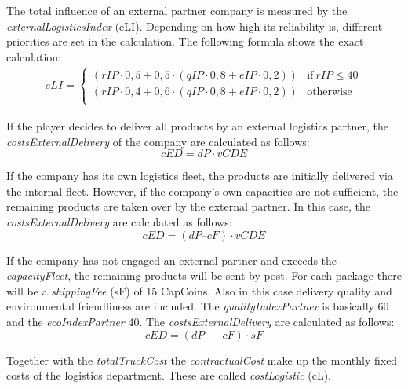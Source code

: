 The total influence of an external partner company is measured by the \textit{externalLogisticsIndex} (\gls{eLI}). Depending on how high its reliability is, different priorities are set in the calculation. The following formula shows the exact calculation: 
\begin{equation}
\label{func:externalLogisticIndex}
\begin{aligned}
eLI = 
    \begin{cases}
     (rIP\cdot0,5 + 0,5\cdot(qIP\cdot0,8 + eIP\cdot0,2)) & \text{if} ~rIP \leq 40\\
     (rIP\cdot0,4 + 0,6\cdot(qIP\cdot0,8 + eIP\cdot0,2)) & \text{otherwise} \\
    \end{cases}
\end{aligned}
\end{equation}

If the player decides to deliver all products by an external logistics partner, the \textit{costsExternalDelivery} of the company are calculated as follows:
\begin{equation}
\label{func:costExternalDelivery_all}
   cED = dP \cdot vCDE
\end{equation}

If the company has its own logistics fleet, the products are initially delivered via the internal fleet. However, if the company's own capacities are not sufficient, the remaining products are taken over by the external partner. In this case, the \textit{costsExternalDelivery} are calculated as follows: 
\begin{equation}
\label{func:costExternalDelivery_partly}
    cED = ( dP – cF ) \cdot vCDE
\end{equation}

If the company has not engaged an external partner and exceeds the \textit{capacityFleet}, the remaining products will be sent by post. For each package there will be a \textit{shippingFee} (\gls{sF}) of 15 CapCoins. Also in this case delivery quality and environmental friendliness are included. The \textit{qualityIndexPartner} is basically 60 and the \textit{ecoIndexPartner} 40. The \textit{costsExternalDelivery} are calculated as follows:  
\begin{equation}
\label{func:costExternalDelivery_post}
    cED = ( dP \ - \ cF ) \cdot sF
\end{equation}

Together with the \textit{totalTruckCost} the \textit{contractualCost} make up the monthly fixed costs of the logistics department. These are called \textit{costLogistic} (\gls{cL}). 

